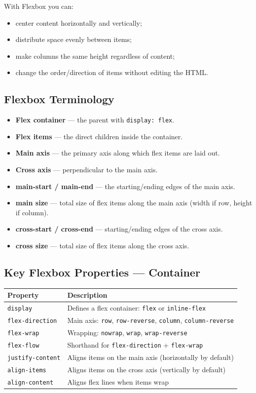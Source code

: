 \documentclass[12pt]{article}
\begin{document}
With Flexbox you can:
\begin{itemize}
    \item center content horizontally and vertically;
    \item distribute space evenly between items;
    \item make columns the same height regardless of content;
    \item change the order/direction of items without editing the HTML.
\end{itemize}

\subsection{Flexbox Terminology}
\begin{itemize}
    \item \textbf{Flex container} — the parent with \texttt{display: flex}.
    \item \textbf{Flex items} — the direct children inside the container.
    \item \textbf{Main axis} — the primary axis along which flex items are laid out.
    \item \textbf{Cross axis} — perpendicular to the main axis.
    \item \textbf{main-start / main-end} — the starting/ending edges of the main axis.
    \item \textbf{main size} — total size of flex items along the main axis (width if row, height if column).
    \item \textbf{cross-start / cross-end} — starting/ending edges of the cross axis.
    \item \textbf{cross size} — total size of flex items along the cross axis.
\end{itemize}

\subsection{Key Flexbox Properties — Container}
\begin{center}
\begin{tabular}{ll}
\textbf{Property} & \textbf{Description} \\
\hline
\texttt{display} & Defines a flex container: \texttt{flex} or \texttt{inline-flex} \\
\texttt{flex-direction} & Main axis: \texttt{row}, \texttt{row-reverse}, \texttt{column}, \texttt{column-reverse} \\
\texttt{flex-wrap} & Wrapping: \texttt{nowrap}, \texttt{wrap}, \texttt{wrap-reverse} \\
\texttt{flex-flow} & Shorthand for \texttt{flex-direction} + \texttt{flex-wrap} \\
\texttt{justify-content} & Aligns items on the main axis (horizontally by default) \\
\texttt{align-items} & Aligns items on the cross axis (vertically by default) \\
\texttt{align-content} & Aligns flex lines when items wrap \\
\end{tabular}
\end{center}
\end{document}
